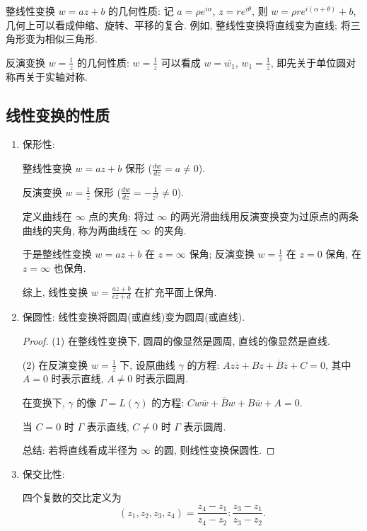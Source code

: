\documentclass[theorem=false,mathfont=none,openany,sub3section]{easybook}
\begin{document}
整线性变换 $w=az+b$ 的几何性质: 记 $a=\rho e^{i\alpha}$, $z=re^{i\theta}$, 则 $w=\rho re^{i(\alpha+\theta)}+b$, 几何上可以看成伸缩、旋转、平移的复合. 例如, 整线性变换将直线变为直线; 将三角形变为相似三角形.

反演变换 $w=\frac{1}{z}$ 的几何性质: $w=\frac{1}{z}$ 可以看成 $w=\overline{w_{1}}$, $w_{1}=\frac{1}{\overline{z}}$, 即先关于单位圆对称再关于实轴对称.

\subsection{线性变换的性质}

\begin{enumerate}
  \item 保形性:\par
  整线性变换 $w=az+b$ 保形 ($\frac{dw}{dz}=a\neq0$).\par
  反演变换 $w=\frac{1}{z}$ 保形 ($\frac{dw}{dz}=-\frac{1}{z^{2}}\neq0$).\par
  定义曲线在 $\infty$ 点的夹角: 将过 $\infty$ 的两光滑曲线用反演变换变为过原点的两条曲线的夹角, 称为两曲线在 $\infty$ 的夹角.\par
  于是整线性变换 $w=az+b$ 在 $z=\infty$ 保角; 反演变换 $w=\frac{1}{z}$ 在 $z=0$ 保角, 在 $z=\infty$ 也保角.\par
  综上, 线性变换 $w=\frac{az+b}{cz+d}$ 在扩充平面上保角.

  \item 保圆性: 线性变换将圆周(或直线)变为圆周(或直线).\par
  \begin{proof}
    (1) 在整线性变换下, 圆周的像显然是圆周, 直线的像显然是直线.\par
    (2) 在反演变换 $w=\frac{1}{z}$ 下, 设原曲线 $\gamma$ 的方程: $A z\overline{z}+B z+\overline{B}\overline{z}+C=0$,
    其中 $A=0$ 时表示直线, $A\neq0$ 时表示圆周.\par
    在变换下, $\gamma$ 的像 $\Gamma=L(\gamma)$ 的方程:
    $C w\overline{w}+\overline{B}w+B\overline{w}+A=0$.\par
    当 $C=0$ 时 $\Gamma$ 表示直线, $C\neq0$ 时 $\Gamma$ 表示圆周.\par
    总结: 若将直线看成半径为 $\infty$ 的圆, 则线性变换保圆性.
  \end{proof}
  \item 保交比性:\par
  \begin{definition}
    四个复数的交比定义为
    \[
    (z_{1},z_{2},z_{3},z_{4})=\frac{z_{4}-z_{1}}{z_{4}-z_{2}}:\frac{z_{3}-z_{1}}{z_{3}-z_{2}}.
    \]
  \end{definition}


\end{enumerate}
\end{document}

